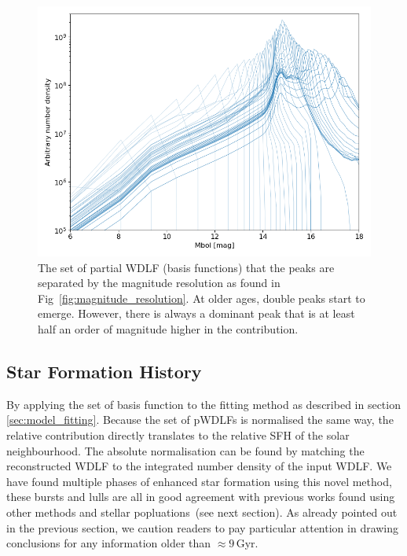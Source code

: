 \documentclass[fleqn,usenatbib]{mnras}
\begin{document}
\begin{figure}
    \includegraphics[width=\columnwidth]{figures/fig_04_basis_pwdlf.png}
    \caption{The set of partial WDLF (basis functions) that the peaks are
    separated by the magnitude resolution as found in
    Fig~\ref{fig:magnitude_resolution}. At older ages, double peaks start to
    emerge. However, there is always a dominant peak that is at least half an
    order of magnitude higher in the contribution.}
    \label{fig:basis_pwdlf}
\end{figure}

\subsection{Star Formation History}

By applying the set of basis function to the fitting method as described in
section \textsection\ref{sec:model_fitting}. Because the set of pWDLFs is
normalised the same way, the relative contribution directly translates to the
relative SFH of the solar neighbourhood. The absolute normalisation can be
found by matching the reconstructed WDLF to the integrated number density of
the input WDLF. We have found multiple phases of enhanced star formation using
this novel method, these bursts and lulls are all in good agreement with
previous works found using other methods and stellar popluations~(see next
section). As already pointed out in the previous section, we caution readers to
pay particular attention in drawing conclusions for any information older than
$\approx9$\,Gyr.
\end{document}
